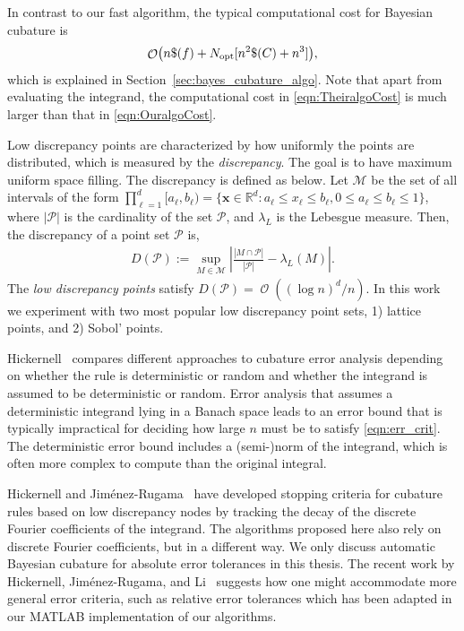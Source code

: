 \documentclass{iitthesis}          %
\DeclareMathOperator{\Order}{{\mathcal O}}
\newcommand{\bm}[1]{\boldsymbol{#1}}
\newcommand{\vx}{\bm{x}}
\newcommand{\opt}{\textup{opt}}
\def\abs#1{\ensuremath{\left \lvert #1 \right \rvert}}
\begin{document}
In contrast to our fast algorithm, the typical computational cost for Bayesian cubature is
\begin{equation} \label{eqn:TheiralgoCost}
\Order\bigl(n \$(f) + N_{\opt}[n^2\$(C) + n^3] \bigr),
\end{equation} 
which is explained in Section~\ref{sec:bayes_cubature_algo}. Note that apart from evaluating the integrand, the computational cost in \eqref{eqn:TheiralgoCost} is much larger than that in \eqref{eqn:OuralgoCost}.  




Low discrepancy points are characterized by how uniformly the points are distributed, which is measured by the \emph{discrepancy}. %
The goal is to have maximum uniform space filling. The discrepancy is defined as below.
Let $\mathcal{M}$ be the set of all intervals of the form $\prod_{\ell=1}^{d} [a_\ell, b_\ell) = \{ \vx \in \mathbb{R}^d : a_\ell \le x_\ell \le b_\ell, 0 \le a_\ell \le b_\ell \le 1 \}$, where $\abs{\mathcal{P}}$ is the cardinality of the set $\mathcal{P}$, and $\lambda_L$ is the Lebesgue measure. Then, the discrepancy of a point set $\mathcal{P}$ is,
\begin{align*}
D(\mathcal{P}) := \sup_{M \in \mathcal{M}} 
\abs{ \frac{\abs{M \cap \mathcal{P}}}{\abs{\mathcal{P}}} - \lambda_L(M) }.
\end{align*}
The \emph{low discrepancy points} satisfy $D(\mathcal{P}) = \Order((\log n)^d/n)$.
In this work we experiment with two most popular low discrepancy point sets, 1) lattice points, and 2) Sobol' points.


Hickernell~\cite{Hic17a} compares different approaches to cubature error analysis depending on whether the rule is deterministic or random and whether the integrand is assumed to be deterministic or random.  Error analysis that assumes a deterministic integrand lying in a Banach space leads to an error bound that is typically impractical for deciding how large $n$ must be to satisfy \eqref{eqn:err_crit}.  The deterministic error bound includes a (semi-)norm of the integrand, which is often more complex to compute than the original integral.

Hickernell and Jim\'enez-Rugama~\cite{HicJim16a,JimHic16a} have developed stopping criteria for cubature rules based on low discrepancy nodes by tracking the decay of the discrete Fourier coefficients of the integrand.  The algorithms proposed here also rely on discrete Fourier coefficients, but in a different way.  We only discuss automatic Bayesian cubature for absolute error tolerances in this thesis. The recent work by Hickernell, Jim\'enez-Rugama, and Li~\cite{HicEtal17a} suggests how one might accommodate more general error criteria, such as relative error tolerances which has been adapted in our MATLAB implementation of our algorithms.
\end{document}
